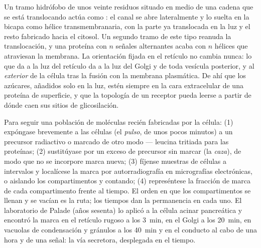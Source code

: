 \begin{proposition}\label{prop:b3:membrane-traffic:topology}
Un tramo hidrófobo de unos veinte residuos situado en medio de una cadena
que se está translocando actúa como \emph{}: el canal se abre lateralmente y lo suelta en la bicapa
como hélice transmembranaria, con la parte ya translocada en la luz y el
resto fabricado hacia el citosol. Un segundo tramo de este tipo reanuda
la translocación, y una proteína con $n$ señales alternantes acaba con
$n$ hélices que atraviesan la membrana. La orientación fijada en el
retículo no cambia nunca: lo que da a la luz del retículo da a la luz del
Golgi y de toda vesícula posterior, y al \emph{exterior} de la célula
tras la fusión con la membrana plasmática. De ahí que los azúcares,
añadidos solo en la luz, estén siempre en la cara extracelular de una
proteína de superficie, y que la topología de un receptor pueda leerse a
partir de dónde caen sus sitios de glicosilación.
\end{proposition}

\begin{method}\label{met:b3:membrane-traffic:pulse-chase}
Para seguir una población de moléculas recién fabricadas por la célula:
(1) expóngase brevemente a las células (el \emph{pulso}, de unos pocos
minutos) a un precursor radiactivo o marcado de otro modo --- leucina
tritiada para las proteínas; (2) sustitúyase por un exceso de precursor
sin marcar (la \emph{caza}), de modo que no se incorpore marca nueva;
(3) fíjense muestras de células a intervalos y localícese la marca por
autorradiografía en micrografías electrónicas, o aislando los
compartimentos y contando; (4) represéntese la fracción de marca de cada
compartimento frente al tiempo. El orden en que los compartimentos se
llenan y se vacían es la ruta; los tiempos dan la permanencia en cada
uno. El laboratorio de Palade (años sesenta) lo aplicó a la célula acinar
pancreática y encontró la marca en el retículo rugoso a los \qty{3}{min},
en el Golgi a los \qty{20}{min}, en vacuolas de condensación y gránulos a
los \qty{40}{min} y en el conducto al cabo de una hora y de una señal: la
vía secretora, desplegada en el tiempo.
\end{method}

